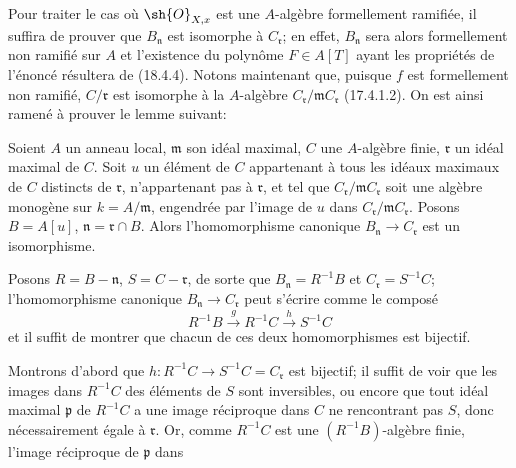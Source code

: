 Pour traiter le cas où $\sh{O}_{X,x}$ est une $A$-algèbre formellement ramifiée, il suffira de prouver que $B_{\mathfrak n}$ est isomorphe à $C_{\mathfrak r}$; en effet, $B_{\mathfrak n}$ sera alors formellement non ramifié sur $A$ et l'existence du polynôme $F\in A[T]$ ayant les propriétés de l'énoncé résultera de (18.4.4). Notons maintenant que, puisque $f$ est formellement non ramifié, $C/\mathfrak r$ est isomorphe à la $A$-algèbre $C_{\mathfrak r}/\mathfrak mC_{\mathfrak r}$ (17.4.1.2). On est ainsi ramené à prouver le lemme suivant:

\begin{lemma}[18.4.6.1]
\label{IV.18.4.6.1}
Soient $A$ un anneau local, $\mathfrak m$ son idéal maximal, $C$ une $A$-algèbre finie, $\mathfrak r$ un idéal maximal de $C$. Soit $u$ un élément de $C$ appartenant à tous les idéaux maximaux de $C$ distincts de $\mathfrak r$, n'appartenant pas à $\mathfrak r$, et tel que $C_{\mathfrak r}/\mathfrak mC_{\mathfrak r}$ soit une algèbre monogène sur $k=A/\mathfrak m$, engendrée par l'image de $u$ dans $C_{\mathfrak r}/\mathfrak mC_{\mathfrak r}$. Posons $B=A[u]$, $\mathfrak n=\mathfrak r\cap B$. Alors l'homomorphisme canonique $B_{\mathfrak n}\to C_{\mathfrak r}$ est un isomorphisme.
\end{lemma}

Posons $R=B-\mathfrak n$, $S=C-\mathfrak r$, de sorte que $B_{\mathfrak n}=R^{-1}B$ et $C_{\mathfrak r}=S^{-1}C$; l'homomorphisme canonique $B_{\mathfrak n}\to C_{\mathfrak r}$ peut s'écrire comme le composé
\[
  R^{-1}B\xrightarrow{g}R^{-1}C\xrightarrow{h}S^{-1}C
\]
et il suffit de montrer que chacun de ces deux homomorphismes est bijectif.

Montrons d'abord que $h:R^{-1}C\to S^{-1}C=C_{\mathfrak r}$ est bijectif; il suffit de voir que les images dans $R^{-1}C$ des éléments de $S$ sont inversibles, ou encore que tout idéal maximal $\mathfrak p$ de $R^{-1}C$ a une image réciproque dans $C$ ne rencontrant pas $S$, donc nécessairement égale à $\mathfrak r$. Or, comme $R^{-1}C$ est une $(R^{-1}B)$-algèbre finie, l'image réciproque de $\mathfrak p$ dans

